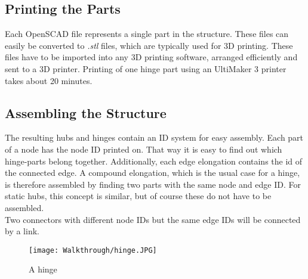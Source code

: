 \subsection{Printing the Parts}
Each OpenSCAD file represents a single part in the structure. These files can easily be converted to \textit{.stl} files, which are typically used for 3D printing. These files have to be imported into any 3D printing software, arranged efficiently and sent to a 3D printer. Printing of one hinge part using an UltiMaker 3 printer takes about 20 minutes.

\subsection{Assembling the Structure}
The resulting hubs and hinges contain an ID system for easy assembly. Each part of a node has the node ID printed on. That way it is easy to find out which hinge-parts belong together. Additionally, each edge elongation  contains the id of the connected edge. A compound elongation, which is the usual case for a hinge, is therefore assembled by finding two parts with the same node and edge ID. For static hubs, this concept is similar, but of course these do not have to be assembled.\\
Two connectors with different node IDs but the same edge IDs will be connected by a link.
\begin{figure}[h!]
    \texttt{[image: Walkthrough/hinge.JPG]}
    \centering
    \caption{A hinge}
    \label{fig:hinge}
\end{figure}
